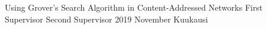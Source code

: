 \iffin
{}
\renewcommand{\appname}{Liitteet}
\else
{}
\renewcommand{\appname}{Appendices}
\fi

{Using Grover's Search Algorithm in Content-Addressed Networks }
{First Supervisor}
{Second Supervisor}
{2019}
{November}
{Kuukausi}


\gentitle



%
%
\pagestyle{empty}


%
%
\tableofcontents
\clearpage

%
%
%

